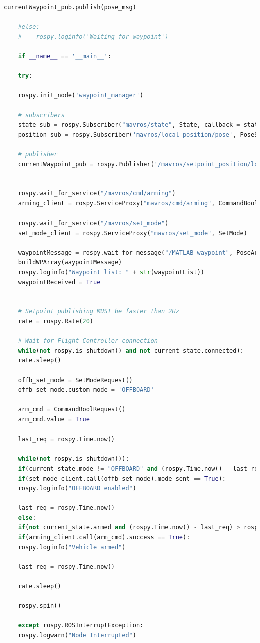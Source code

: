 \begin{lstlisting}[language=Python]
	currentWaypoint_pub.publish(pose_msg)
	
	#else:
	#    rospy.loginfo('Waiting for waypoint')
	
	if __name__ == '__main__':
	
	try:
	
	rospy.init_node('waypoint_manager')
	
	# subscribers
	state_sub = rospy.Subscriber("mavros/state", State, callback = state_cb)
	position_sub = rospy.Subscriber('mavros/local_position/pose', PoseStamped, callback = WP_callback)
	
	# publisher
	currentWaypoint_pub = rospy.Publisher('/mavros/setpoint_position/local', PoseStamped, queue_size=10)
	
	
	rospy.wait_for_service("/mavros/cmd/arming")
	arming_client = rospy.ServiceProxy("mavros/cmd/arming", CommandBool) 
	
	rospy.wait_for_service("/mavros/set_mode")
	set_mode_client = rospy.ServiceProxy("mavros/set_mode", SetMode)
	
	waypointMessage = rospy.wait_for_message("/MATLAB_waypoint", PoseArray)
	buildWPArray(waypointMessage)
	rospy.loginfo("Waypoint list: " + str(waypointList))
	waypointReceived = True    
	
	
	# Setpoint publishing MUST be faster than 2Hz
	rate = rospy.Rate(20)
	
	# Wait for Flight Controller connection
	while(not rospy.is_shutdown() and not current_state.connected):
	rate.sleep()
	
	offb_set_mode = SetModeRequest()
	offb_set_mode.custom_mode = 'OFFBOARD'
	
	arm_cmd = CommandBoolRequest()
	arm_cmd.value = True
	
	last_req = rospy.Time.now()
	
	while(not rospy.is_shutdown()):
	if(current_state.mode != "OFFBOARD" and (rospy.Time.now() - last_req) > rospy.Duration(5.0)):
	if(set_mode_client.call(offb_set_mode).mode_sent == True):
	rospy.loginfo("OFFBOARD enabled")
	
	last_req = rospy.Time.now()
	else:
	if(not current_state.armed and (rospy.Time.now() - last_req) > rospy.Duration(5.0)):
	if(arming_client.call(arm_cmd).success == True):
	rospy.loginfo("Vehicle armed")
	
	last_req = rospy.Time.now()
	
	rate.sleep()
	
	rospy.spin()
	
	except rospy.ROSInterruptException:
	rospy.logwarn("Node Interrupted")
\end{lstlisting}


